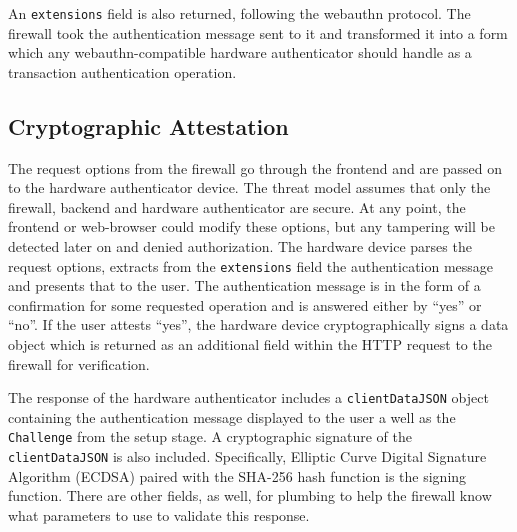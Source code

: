 An \lstinline{extensions} field is also returned, following the webauthn protocol. The firewall took the authentication message sent to it and transformed it into a form which any webauthn-compatible hardware authenticator should handle as a transaction authentication operation.



\subsection{Cryptographic Attestation}\label{Sec:CryptographicAttestation}

The request options from the firewall go through the frontend and are passed on to the hardware authenticator device. The threat model assumes that only the firewall, backend and hardware authenticator are secure. At any point, the frontend or web-browser could modify these options, but any tampering will be detected later on and denied authorization. The hardware device parses the request options, extracts from the \lstinline{extensions} field the authentication message and presents that to the user. The authentication message is in the form of a confirmation for some requested operation and is answered either by ``yes'' or ``no''. If the user attests ``yes'', the hardware device cryptographically signs a data object which is returned as an additional field within the HTTP request to the firewall for verification.

The response of the hardware authenticator includes a \lstinline{clientDataJSON} object containing the authentication message displayed to the user a well as the \lstinline{Challenge} from the setup stage. A cryptographic signature of the \lstinline{clientDataJSON} is also included. Specifically, Elliptic Curve Digital Signature Algorithm (ECDSA) paired with the SHA-256 hash function is the signing function. There are other fields, as well, for plumbing to help the firewall know what parameters to use to validate this response.

